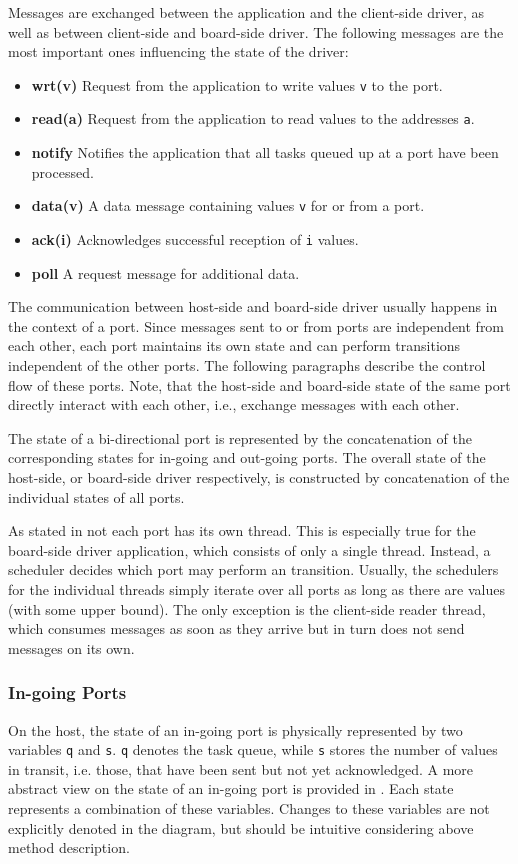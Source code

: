 \documentclass{report}
\begin{document}
Messages are exchanged between the application and the client-side driver, as well as between client-side and board-side driver. The following messages are the most important ones influencing the state of the driver:
\begin{itemize} \itemsep1pt \parskip0pt 
  \item \textbf{wrt(v)} Request from the application to write values \texttt{v} to the port.
  \item \textbf{read(a)} Request from the application to read values to the addresses \texttt{a}.
  \item \textbf{notify} Notifies the application that all tasks queued up at a port have been processed.
  \item \textbf{data(v)} A data message containing values \texttt{v} for or from a port.
  \item \textbf{ack(i)} Acknowledges successful reception of \texttt{i} values.
  \item \textbf{poll} A request message for additional data.
\end{itemize}

The communication between host-side and board-side driver usually happens in the context of a port. Since messages sent to or from ports are independent from each other, each port maintains its own state and can perform transitions independent of the other ports. The following paragraphs describe the control flow of these ports. Note, that the host-side and board-side state of the same port directly interact with each other, i.e., exchange messages with each other.

The state of a bi-directional port is represented by the concatenation of the corresponding states for in-going and out-going ports. The overall state of the host-side, or board-side driver respectively, is constructed by concatenation of the individual states of all ports.

As stated in  not each port has its own thread. This is especially true for the board-side driver application, which consists of only a single thread. Instead, a scheduler decides which port may perform an transition. Usually, the schedulers for the individual threads simply iterate over all ports as long as there are values (with some upper bound). The only exception is the client-side reader thread, which consumes messages as soon as they arrive but in turn does not send messages on its own.

\subsubsection{In-going Ports}
On the host, the state of an in-going port is physically represented by two variables \texttt{q} and \texttt{s}. \texttt{q} denotes the task queue, while \texttt{s} stores the number of values in transit, i.e. those, that have been sent but not yet acknowledged. A more abstract view on the state of an in-going port is provided in . Each state represents a combination of these variables. Changes to these variables are not explicitly denoted in the diagram, but should be intuitive considering above method description.
\end{document}

